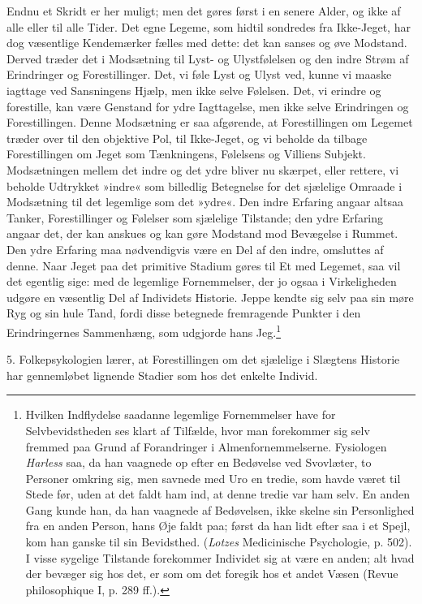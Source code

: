 \documentclass[12pt,a4paper,openany]{book}
\newcommand{\opage}[1]{\marginnote{\footnotesize\textit{[#1]}}}
\begin{document}
Endnu et Skridt er her muligt; men det gøres først i en senere Alder, og
ikke af alle eller til alle Tider. Det egne Legeme, som hidtil sondredes
fra Ikke-Jeget, har dog væsentlige Kendemærker fælles med dette: det kan
sanses og øve Modstand. Derved træder det i Modsætning til Lyst- og
Ulystfølelsen og den indre Strøm af Erindringer og Forestillinger. Det,
vi føle Lyst og Ulyst ved, kunne vi maaske iagttage ved Sansningens
Hjælp, men ikke selve Følelsen. Det, vi erindre og forestille, kan være
Genstand for ydre Iagttagelse, men ikke selve Erindringen og
Forestillingen.
\opage{7}Denne Modsætning er saa afgørende, at Forestillingen om Legemet
træder over til den objektive Pol, til Ikke-Jeget, og vi beholde da
tilbage Forestillingen om Jeget som Tænkningens, Følelsens og Villiens
Subjekt. Modsætningen mellem det indre og det ydre bliver nu skærpet,
eller rettere, vi beholde Udtrykket »indre« som billedlig Betegnelse for
det sjælelige Omraade i Modsætning til det legemlige som det »ydre«. Den
indre Erfaring angaar altsaa Tanker, Forestillinger og Følelser som
sjælelige Tilstande; den ydre Erfaring angaar det, der kan anskues og
kan gøre Modstand mod Bevægelse i Rummet. Den ydre Erfaring maa
nødvendigvis være en Del af den indre, omsluttes af denne. Naar Jeget
paa det primitive Stadium gøres til Et med Legemet, saa vil det egentlig
sige: med de legemlige Fornemmelser, der jo ogsaa i Virkeligheden udgøre
en væsentlig Del af Individets Historie. Jeppe kendte sig selv paa sin
møre Ryg og sin hule Tand, fordi disse betegnede fremragende Punkter i
den Erindringernes Sammenhæng, som udgjorde hans
Jeg.\footnote[1]{Hvilken Indflydelse saadanne legemlige Fornemmelser
have for Selvbevidstheden ses klart af Tilfælde, hvor man forekommer sig
selv fremmed paa Grund af Forandringer i Almenfornemmelserne. Fysiologen
\emph{Harless} saa, da han vaagnede op efter en Bedøvelse ved Svovlæter,
to Personer omkring sig, men savnede med Uro en tredie, som havde været
til Stede før, uden at det faldt ham ind, at denne tredie var ham selv.
En anden Gang kunde han, da han vaagnede af Bedøvelsen, ikke skelne sin
Personlighed fra en anden Person, hans Øje faldt paa; først da han lidt
efter saa i et Spejl, kom han ganske til sin Bevidsthed. (\emph{Lotzes}
Medicinische Psychologie, p. 502). I visse sygelige Tilstande forekommer
Individet sig at være en anden; alt hvad der bevæger sig hos det, er som
om det foregik hos et andet Væsen (Revue philosophique I, p. 289 ff.).}

5. Folkepsykologien lærer, at Forestillingen om det sjælelige i Slægtens
Historie har gennemløbet lignende Stadier som hos det enkelte Individ.
\end{document}
